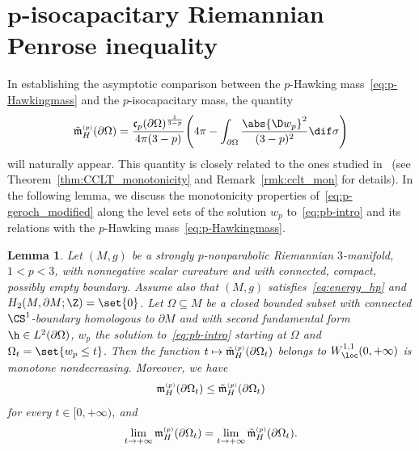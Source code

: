 \documentclass[10pt,a4paper]{amsart}
\numberwithin{equation}{section}
\newtheorem{Lemma}[Theorem]{Lemma}
\renewcommand{\ncapa}{\mathfrak{c}}
\newcommand{\ma}{\mathfrak{m}}
\newcommand{\tp}[1][p]{{\text{\tiny$(#1)$}}}
\begin{document}
\section[p-isocapacitary Riemannian Penrose inequality]{$\boldsymbol{p}$-isocapacitary Riemannian Penrose inequality}
\label{sec:3}
In establishing the asymptotic comparison between the $p$-Hawking mass~\eqref{eq:p-Hawkingmass} and the $p$-iso\-capacitary mass, the quantity
\begin{equation}\label{eq:p-geroch_modified} \tilde{\ma}^{\tp}_H(\partial \Omega)= \frac{\ncapa_p(\partial \Omega)^{\frac{1}{3-p}}}{4\pi (3-p)}\Bigg( 4 \pi - \int_{\partial \Omega} \frac{\abs{ \D w_p}^2}{(3-p)^2} \dif \sigma\Bigg)
\end{equation}
will naturally appear. This quantity is closely related to the ones studied in~\cite{chan_monotonicitygreenfunctions_2022,munteanu_comparisontheorems3dmanifolds_2023} (see Theorem~\ref{thm:CCLT_monotonicity} and Remark~\ref{rmk:cclt_mon} for details). In the following lemma, we discuss the monotonicity properties of~\eqref{eq:p-geroch_modified} along the level sets of the solution $w_p$ to~\eqref{eq:pb-intro} and its relations with the $p$-Hawking mass~\eqref{eq:p-Hawkingmass}.

\begin{Lemma}\label{thm:inequality_modifiedgeroch_AMMO}
Let $(M,g)$ be a strongly $p$-nonparabolic Riemannian $3$-manifold, $1<p<3$, with nonnegative scalar curvature and with connected, compact, possibly empty boundary. Assume also that $(M,g)$ satisfies~\eqref{eq:energy_hp} and $H_2( M, \partial M; \Z)=\set{0}$. Let $\Omega\subseteq M$ be a closed bounded subset with connected $\CS^1$-boundary homologous to $\partial M$ and with second fundamental form $\h \in L^2(\partial \Omega)$, $w_p$ the solution to~\eqref{eq:pb-intro} starting at $\Omega$ and $\Omega_t= \set{w_p \leq t}$. Then the function $t \mapsto \tilde{\ma}^{\tp}_H(\partial \Omega_t)$ belongs to $W^{1,1}_{\loc}(0,+\infty)$ is monotone nondecreasing. Moreover, we have
\begin{equation}\label{eq:inequality_modifiedgeroch_AMMO}
 \ma^{\tp}_{H} ( \partial \Omega_t)\leq\tilde{\ma}^{\tp}_H(\partial \Omega_t)
\end{equation}
for every $t \in [0,+\infty)$, and
\begin{equation}\label{eq:limit_behaviour_phawking}
 \lim_{t \to+\infty} \ma^{\tp}_{H} ( \partial \Omega_t) = \lim_{t \to +\infty} \tilde{\ma}^{\tp}_H(\partial \Omega_t).
\end{equation}
\end{Lemma}
\end{document}
